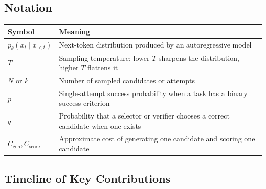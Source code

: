 \subsection*{Notation}

\begin{center}
\begin{tabularx}{\textwidth}{@{}lX@{}}
\toprule
Symbol & Meaning \\
\midrule
$p_\theta(x_t \mid x_{<t})$ & Next-token distribution produced by an autoregressive model \\
$T$ & Sampling temperature; lower $T$ sharpens the distribution, higher $T$ flattens it \\
$N$ or $k$ & Number of sampled candidates or attempts \\
$p$ & Single-attempt success probability when a task has a binary success criterion \\
$q$ & Probability that a selector or verifier chooses a correct candidate when one exists \\
$C_{\text{gen}}, C_{\text{score}}$ & Approximate cost of generating one candidate and scoring one candidate \\
\bottomrule
\end{tabularx}
\end{center}

\subsection*{Timeline of Key Contributions}

